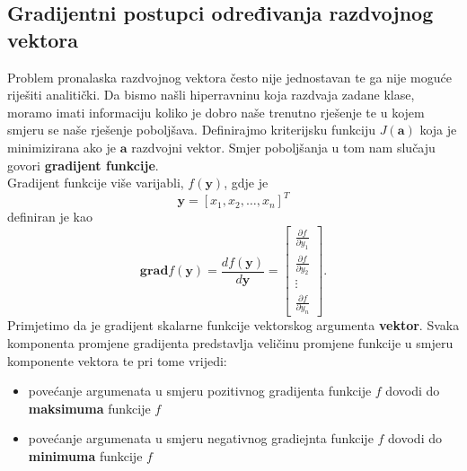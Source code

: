 \documentclass{book}
\begin{document}
\subsection{Gradijentni postupci određivanja razdvojnog vektora}

Problem pronalaska razdvojnog vektora često nije jednostavan te ga nije moguće
riješiti analitički. Da bismo našli hiperravninu koja razdvaja zadane klase,
moramo imati informaciju koliko je dobro naše trenutno rješenje te u kojem
smjeru se naše rješenje poboljšava. Definirajmo kriterijsku funkciju
$J(\mathbf{a})$ koja je minimizirana  ako je $\mathbf{a}$ razdvojni vektor.
Smjer poboljšanja u tom nam slučaju govori \textbf{gradijent funkcije}. \\

Gradijent funkcije više varijabli, $f(\mathbf{y})$, gdje je $$ \mathbf{y} =
[x_1, x_2, \ldots, x_n]^T $$
definiran je kao 
$$ \mathbf{grad}f(\mathbf{y}) = \frac{df(\mathbf{y})}{d\mathbf{y}} =
\begin{bmatrix} \frac{\partial f}{\partial y_1} \\
\frac{\partial f}{\partial y_2} \\
\vdots \\
\frac{\partial f}{\partial y_n}
\end{bmatrix}. $$ 
Primjetimo da je gradijent skalarne funkcije vektorskog argumenta
\textbf{vektor}. Svaka komponenta promjene gradijenta predstavlja veličinu
promjene funkcije u smjeru komponente vektora te pri tome vrijedi: \\

\begin{itemize}
  \item  povećanje argumenata u smjeru pozitivnog gradijenta funkcije $f$ dovodi
  do \textbf{maksimuma} funkcije $f$
  \item povećanje argumenata u smjeru negativnog gradiejnta funkcije $f$ dovodi
  do \textbf{minimuma} funkcije $f$ \\
\end{itemize}
\end{document}
